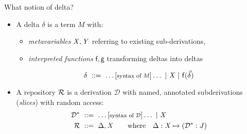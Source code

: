 \documentclass{beamer}
\theoremstyle{example}
\begin{document}
\begin{frame}{What notion of delta?}
  \begin{itemize}
  \item A \textcolor{greenish}{delta} $\delta$ is a term $M$ with:
    \begin{itemize}
    \item \emph{metavariables} $\text{\textit{X}}, \text{\textit{Y}}$ referring to existing
      sub-derivations,
    \item \emph{interpreted functions} $\mathsf{f, g}$ transforming
      deltas into deltas
    \end{itemize}

    $$ \delta \ ::=\  \ldots \text{[{\footnotesize syntax of $M$}]} \ldots \ |\ 
    \text{\textit{X}} \ |\  {\rm\mathsf{f}}({\vec\delta}) $$
    \vspace{1em}
    \pause
  \item A \textcolor{greenish}{repository} $\mathcal{R}$ is a derivation
    $\mathcal D$ with named, annotated subderivations (\emph{slices})
    with random access:
    \begin{align*}
      \mathcal D^* &\ ::=\  \ldots\text{[{\footnotesize syntax of $\mathcal D$}]}\ldots
      \ |\  \text{\textit{X}} \\
      \mathcal{R} &\ ::=\  \Delta, \text{\textit{X}} \qquad\text{where}\quad\Delta : \text{\textit{X}}\mapsto (\mathcal D^* : J)
    \end{align*}
  \end{itemize}
\end{frame}
\end{document}
